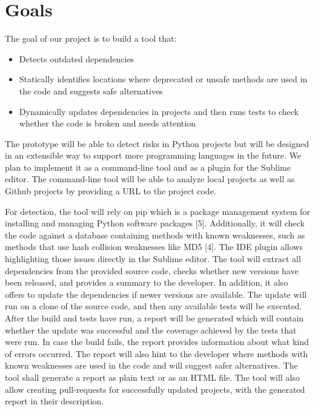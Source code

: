 \documentclass[sigconf]{acmart}
\begin{document}
\section{Goals}

The goal of our project is to build a tool that:
\begin{itemize}
\item Detects outdated dependencies
\item Statically identifies locations where deprecated or unsafe methods are used in the code and suggests safe alternatives
\item Dynamically updates dependencies in projects and then runs tests to check whether the code is broken and needs attention
\end{itemize}


The prototype will be able to detect risks in Python projects but will be designed in an extensible way to support more programming languages in the future. We plan to implement it as a command-line tool and as a plugin for the Sublime editor. The command-line tool will be able to analyze local projects as well as Github projects by providing a URL to the project code.

For detection, the tool will rely on pip which is a package management system for installing and managing Python software packages [5]. Additionally, it will check the code against a database containing methods with known weaknesses, such as methods that use hash collision weaknesses like MD5 [4]. The IDE plugin allows highlighting those issues directly in the Sublime editor.
The tool will extract all dependencies from the provided source code, checks whether new versions have been released, and provides a summary to the developer. In addition, it also offers to update the dependencies if newer versions are available. The update will run on a clone of the source code, and then any available tests will be executed. After the build and tests have run, a report will be generated which will contain whether the update was successful and the coverage achieved by the tests that were run. In case the build fails, the report provides information about what kind of errors occurred. The report will also hint to the developer where methods with known weaknesses are used in the code and will suggest safer alternatives. The tool shall generate a report as plain text or as an HTML file. The tool will also allow creating pull-requests for successfully updated projects, with the generated report in their description.
\end{document}
